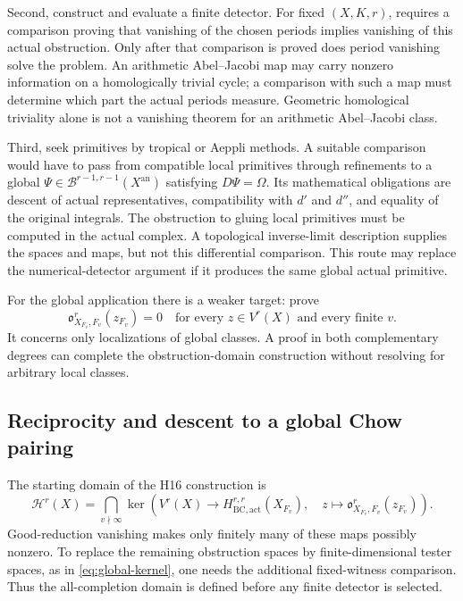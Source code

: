 \documentclass[11pt]{article}
\theoremstyle{definition}
\numberwithin{equation}{section}
\newcommand{\an}{\mathrm{an}}
\newcommand{\B}{\mathcal B}
\newcommand{\Ob}{\mathfrak o}
\begin{document}
Second, construct and evaluate a finite detector. For fixed $(X,K,r)$,  requires a comparison proving that vanishing of the chosen periods implies vanishing of this actual obstruction. Only after that comparison is proved does period vanishing solve the problem. An arithmetic Abel--Jacobi map may carry nonzero information on a homologically trivial cycle; a comparison with such a map must determine which part the actual periods measure. Geometric homological triviality alone is not a vanishing theorem for an arithmetic Abel--Jacobi class.

Third, seek primitives by tropical or Aeppli methods. A suitable comparison would have to pass from compatible local primitives through refinements to a global $\Psi\in\B^{r-1,r-1}(X^{\an})$ satisfying $D\Psi=\Omega$. Its mathematical obligations are descent of actual representatives, compatibility with $d'$ and $d''$, and equality of the original integrals. The obstruction to gluing local primitives must be computed in the actual complex. A topological inverse-limit description supplies the spaces and maps, but not this differential comparison. This route may replace the numerical-detector argument if it produces the same global actual primitive.

For the global application there is a weaker target: prove
\begin{equation}\label{eq:programme-global-vanishing}
 \Ob^r_{X_{F_v},F_v}(z_{F_v})=0
 \quad\text{for every }z\in V^r(X)
 \text{ and every finite }v.
\end{equation}
It concerns only localizations of global classes. A proof in both complementary degrees can complete the obstruction-domain construction without resolving  for arbitrary local classes.

\subsection{Reciprocity and descent to a global Chow pairing}\label{sec:programme-global}

The starting domain of the H16 construction is
\begin{equation}\label{eq:programme-all-completion}
 \mathcal H^r(X)=
 \bigcap_{v\nmid\infty}
 \ker\!\left(V^r(X)\longrightarrow
    H^{r,r}_{\mathrm{BC,act}}(X_{F_v}),\quad
    z\longmapsto\Ob^r_{X_{F_v},F_v}(z_{F_v})\right).
\end{equation}
Good-reduction vanishing makes only finitely many of these maps possibly nonzero. To replace the remaining obstruction spaces by finite-dimensional tester spaces, as in \eqref{eq:global-kernel}, one needs the additional fixed-witness comparison. Thus the all-completion domain is defined before any finite detector is selected.
\end{document}
